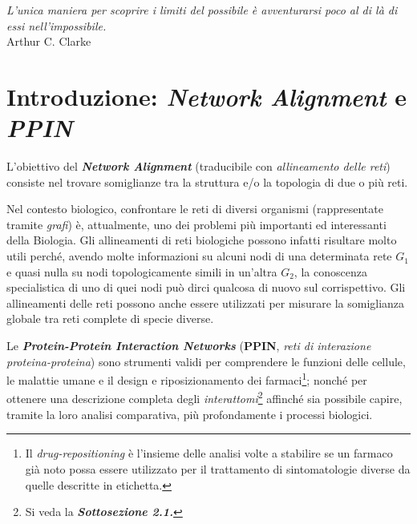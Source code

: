\documentclass[11pt]{article}
\begin{document}
\setcounter{page}{1}
\newpage
\begin{titlepage}
\begin{center}
\vspace*{1cm}
\vfill
\begin{flushright}
\small{\textit{L'unica maniera per scoprire i limiti del possibile è avventurarsi poco al di là di essi nell'impossibile.}}\\
\small{Arthur C. Clarke}\\
\end{flushright}
\vfill
\end{center}
\end{titlepage}
\tableofcontents %
\thispagestyle{empty}
\clearpage

\newpage
\section{Introduzione: \textit{Network Alignment} e \textit{PPIN}}
L'obiettivo del \textit{\textbf{Network Alignment}} (traducibile con \textit{allineamento delle reti}) consiste nel trovare somiglianze tra la struttura e/o la topologia di due o più reti. 

Nel contesto biologico, confrontare le reti di diversi organismi (rappresentate tramite \textit{grafi}) è, attualmente, uno dei problemi più importanti ed interessanti della Biologia. Gli allineamenti di reti biologiche possono infatti risultare molto utili perché, avendo molte informazioni su alcuni nodi di una determinata rete $G_1$ e quasi nulla su nodi topologicamente simili in un'altra $G_2$, la conoscenza specialistica di uno di quei nodi può dirci qualcosa di nuovo sul corrispettivo. Gli allineamenti delle reti possono anche essere utilizzati per misurare la somiglianza globale tra reti complete di specie diverse. 

Le \textit{\textbf{Protein-Protein Interaction Networks}} (\textbf{PPIN}, \textit{reti di interazione proteina-proteina}) sono strumenti validi per comprendere le funzioni delle cellule, le malattie umane e il design e riposizionamento dei farmaci\footnote{Il \textit{drug-repositioning} è l’insieme delle analisi volte a stabilire se un farmaco già noto possa essere utilizzato per il trattamento di sintomatologie diverse da quelle descritte in etichetta.}; nonché per ottenere una descrizione completa degli \textit{interattomi}\footnote{Si veda la \textit{\textbf{Sottosezione 2.1.}}} affinché sia possibile capire, tramite la loro analisi comparativa, più profondamente i processi biologici.
\end{document}
